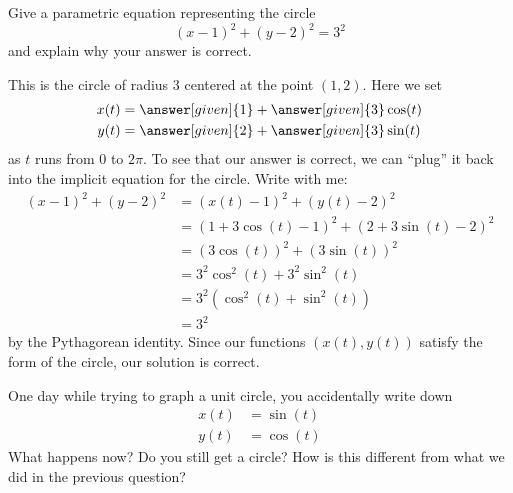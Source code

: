 \documentclass{ximera}
\begin{document}
\begin{example}
  Give a parametric equation representing the circle
  \[
  (x-1)^2 + (y-2)^2 = 3^2
  \]
  and explain why your answer is correct.
  \begin{explanation}
    This is the circle of radius $3$ centered at the point
    $(1,2)$. Here we set
    \begin{align*}
      x(t) &= \answer[given]{1} + \answer[given]{3}\cos(t)\\
      y(t) &= \answer[given]{2} + \answer[given]{3}\sin(t)
    \end{align*}
    as $t$ runs from $0$ to $2\pi$.  To see that our answer is
    correct, we can ``plug'' it back into the implicit equation
    for the circle. Write with me:
    \begin{align*}
      (x-1)^2 + (y-2)^2 &= (x(t)-1)^2 + (y(t)-2)^2\\
      &= (1 + 3\cos(t)-1)^2 + (2 + 3\sin(t)-2)^2\\
      &= (3\cos(t))^2 + (3\sin(t))^2\\
      &= 3^2\cos^2(t) + 3^2\sin^2(t)\\
      &= 3^2(\cos^2(t) + \sin^2(t))\\
      &= 3^2
    \end{align*}
    by the Pythagorean identity. Since our
    functions $(x(t),y(t))$ satisfy the form of the circle, our
    solution is correct.
  \end{explanation}
\end{example}





    \begin{question}
      One day while trying to graph a unit circle, you accidentally
      write down
      \begin{align*}
        x(t) &= \sin(t)\\
        y(t) &= \cos(t)
      \end{align*}
      What happens now? Do you still get a circle? How is this different
      from what we did in the previous question?
      \begin{prompt}
        \begin{multipleChoice}

        \end{multipleChoice}
      \end{prompt}
  \end{question}
\end{document}
